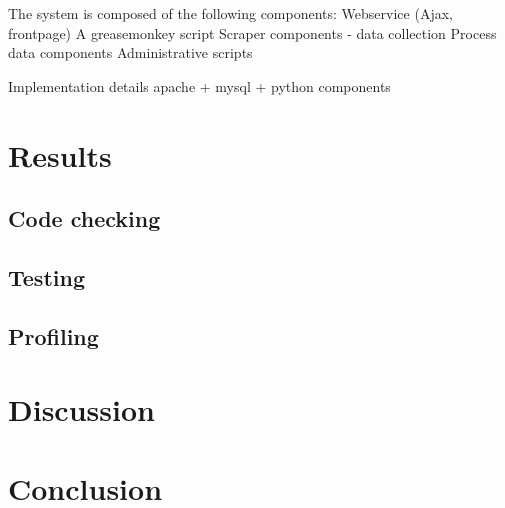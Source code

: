 \documentclass[10pt]{IEEEtran}
\begin{document}
The system is composed of the following components:
Webservice (Ajax, frontpage)
A greasemonkey script
Scraper components - data collection
Process data components
Administrative scripts

Implementation details
apache + mysql + python components

\section{Results}


\subsection{Code checking}


\subsection{Testing}


\subsection{Profiling}


\section{Discussion}


\section{Conclusion}
\end{document}
